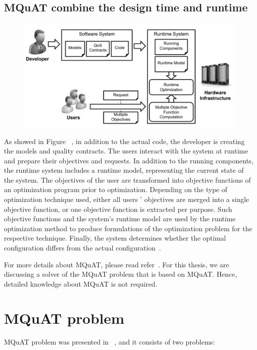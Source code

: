 \subsection{MQuAT combine the design time and runtime}
\begin{figure}
	\centering
	\includegraphics[width=\textwidth]{images/CombinedMQuAT}
	\caption[Layers of MQuAT]{}
	\label{fig:CombinedMQuAT}
\end{figure}
As showed in Figure ~\label{fig:CombinedMQuAT}, in addition to the actual code, the developer is creating the models and quality contracts. The users interact with the system at runtime and prepare their objectives and requests. 
In addition to the running components, the runtime system includes a runtime model, representing the current state of the system. The objectives of the user are transformed into objective functions of an optimization program prior to optimization. Depending on the type of optimization technique used, either all users ' objectives are merged into a single objective function, or one objective function is extracted per purpose. Such objective functions and the system's runtime model are used by the runtime optimization method to produce formulations of the optimization problem for the respective technique. Finally, the system determines whether the optimal configuration differs from the actual configuration~\cite{gotz13, ahmad18}.

For more details about MQuAT, please read refer~\cite{gotz13}. For this thesis, we are discussing a solver of the MQuAT problem that is based on MQuAT. Hence, detailed knowledge about MQuAT is not required. 


\section{MQuAT problem}

MQuAT problem was presented in ~\cite{gotz18}, and it consists of two problems:

